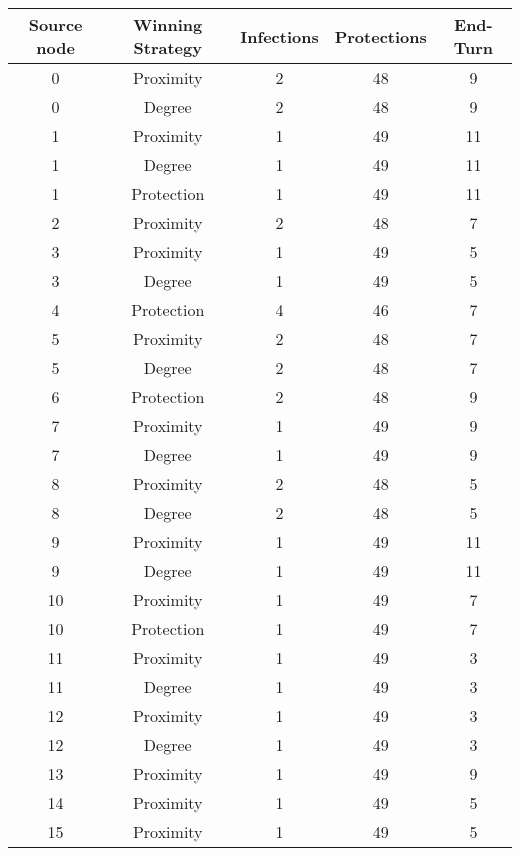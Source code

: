 \documentclass[results.tex]{subfiles}
\begin{document}
\begin{center}
  \begin{tabular}{| c || c | c | c | c |}
    \hline
    {\bfseries Source node} & {\bfseries Winning Strategy} & {\bfseries Infections} & {\bfseries Protections} & {\bfseries End-Turn} \\  %
    \hline\hline
    0 & Proximity & 2 & 48 & 9 \\ 
    \hline
    0 & Degree & 2 & 48 & 9 \\ 
    \hline
    1 & Proximity & 1 & 49 & 11 \\ 
    \hline
    1 & Degree & 1 & 49 & 11 \\ 
    \hline
    1 & Protection & 1 & 49 & 11 \\ 
    \hline
    2 & Proximity & 2 & 48 & 7 \\ 
    \hline
    3 & Proximity & 1 & 49 & 5 \\ 
    \hline
    3 & Degree & 1 & 49 & 5 \\ 
    \hline
    4 & Protection & 4 & 46 & 7 \\ 
    \hline
    5 & Proximity & 2 & 48 & 7 \\ 
    \hline
    5 & Degree & 2 & 48 & 7 \\ 
    \hline
    6 & Protection & 2 & 48 & 9 \\ 
    \hline
    7 & Proximity & 1 & 49 & 9 \\ 
    \hline
    7 & Degree & 1 & 49 & 9 \\ 
    \hline
    8 & Proximity & 2 & 48 & 5 \\ 
    \hline
    8 & Degree & 2 & 48 & 5 \\ 
    \hline
    9 & Proximity & 1 & 49 & 11 \\ 
    \hline
    9 & Degree & 1 & 49 & 11 \\ 
    \hline
    10 & Proximity & 1 & 49 & 7 \\ 
    \hline
    10 & Protection & 1 & 49 & 7 \\ 
    \hline
    11 & Proximity & 1 & 49 & 3 \\ 
    \hline
    11 & Degree & 1 & 49 & 3 \\ 
    \hline
    12 & Proximity & 1 & 49 & 3 \\ 
    \hline
    12 & Degree & 1 & 49 & 3 \\ 
    \hline
    13 & Proximity & 1 & 49 & 9 \\ 
    \hline
    14 & Proximity & 1 & 49 & 5 \\ 
    \hline
    15 & Proximity & 1 & 49 & 5 \\ 

\end{tabular}
\end{center}
\end{document}
